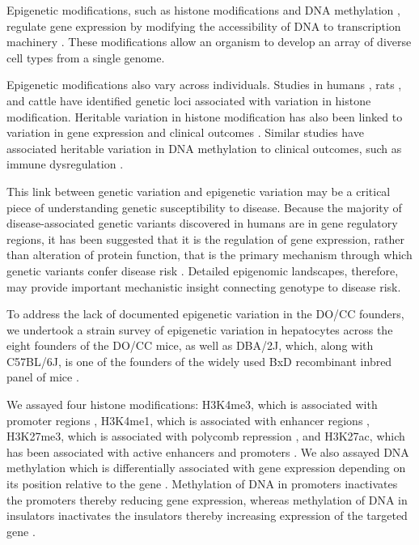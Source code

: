 \documentclass[
  11pt,
]{article}
\begin{document}
Epigenetic modifications, such as histone modifications
\citep{pmid32671792, pmid29625185} and DNA methylation
\citep{pmid21701563, pmid20720541}, regulate gene expression by
modifying the accessibility of DNA to transcription machinery
\citep{lawrence2016lateral, 
jones2012functions, moore2013dna}. These modifications allow an organism
to develop an array of diverse cell types from a single genome.

Epigenetic modifications also vary across individuals. Studies in humans
\citep{mcvicker2013identification, kang2021genetic}, rats
\citep{rintisch2014natural}, and cattle \citep{prowse2022genetic} have
identified genetic loci associated with variation in histone
modification. Heritable variation in histone modification has also been
linked to variation in gene expression
\citep{kang2021genetic, rintisch2014natural, prowse2022genetic} and
clinical outcomes \citep{kang2021genetic}. Similar studies have
associated heritable variation in DNA methylation to clinical outcomes,
such as immune dysregulation \citep{hawe2022genetic}.

This link between genetic variation and epigenetic variation may be a
critical piece of understanding genetic susceptibility to disease.
Because the majority of disease-associated genetic variants discovered
in humans are in gene regulatory regions, it has been suggested that it
is the regulation of gene expression, rather than alteration of protein
function, that is the primary mechanism through which genetic variants
confer disease risk
\citep{maurano2012systematic, farh2015genetic, pmid21617055, pmid19474294}.
Detailed epigenomic landscapes, therefore, may provide important
mechanistic insight connecting genotype to disease risk.

To address the lack of documented epigenetic variation in the DO/CC
founders, we undertook a strain survey of epigenetic variation in
hepatocytes across the eight founders of the DO/CC mice, as well as
DBA/2J, which, along with C57BL/6J, is one of the founders of the widely
used BxD recombinant inbred panel of mice \citep{Ashbrook:2019bd}.

We assayed four histone modifications: H3K4me3, which is associated with
promoter regions \citep{heintzman2007distinct, pmid15680324}, H3K4me1,
which is associated with enhancer regions \citep{heintzman2007distinct},
H3K27me3, which is associated with polycomb repression
\citep{bonasio2010molecular}, and H3K27ac, which has been associated
with active enhancers and promoters
\citep{creyghton2010histone, heintzman2009histone, rada2011unique}. We
also assayed DNA methylation which is differentially associated with
gene expression depending on its position relative to the gene
\citep{moore2013dna, jones2012functions}. Methylation of DNA in
promoters inactivates the promoters thereby reducing gene expression,
whereas methylation of DNA in insulators inactivates the insulators
thereby increasing expression of the targeted gene
\citep{jones2012functions}.
\end{document}
